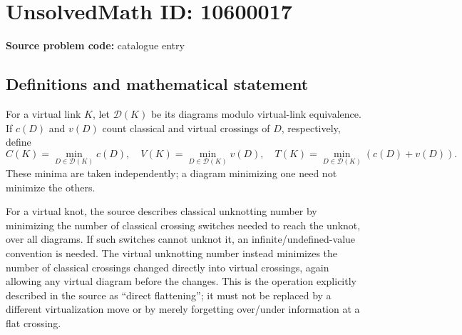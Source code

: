 \documentclass[11pt]{article}
\begin{document}
\section*{UnsolvedMath ID: 10600017}
\textbf{Source problem code:} catalogue entry
\subsection{Definitions and mathematical statement}
For a virtual link \(K\), let \(\mathcal D(K)\) be its diagrams modulo virtual-link equivalence. If \(c(D)\) and \(v(D)\) count classical and virtual crossings of \(D\), respectively, define
\[
 C(K)=\min_{D\in\mathcal D(K)}c(D),\quad
 V(K)=\min_{D\in\mathcal D(K)}v(D),\quad
 T(K)=\min_{D\in\mathcal D(K)}(c(D)+v(D)).
\]
These minima are taken independently; a diagram minimizing one need not minimize the others.

For a virtual knot, the source describes classical unknotting number by minimizing the number of classical crossing switches needed to reach the unknot, over all diagrams. If such switches cannot unknot it, an infinite/undefined-value convention is needed. The virtual unknotting number instead minimizes the number of classical crossings changed directly into virtual crossings, again allowing any virtual diagram before the changes. This is the operation explicitly described in the source as ``direct flattening''; it must not be replaced by a different virtualization move or by merely forgetting over/under information at a flat crossing.
\end{document}
